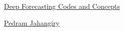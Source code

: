 \documentclass[11pt]{article}
\begin{document}
	\kaishu 
	\setcounter{section}{0}
	\begin{center}
		{\LARGE  \href{https://www.youtube.com/playlist?list=PL2GWo47BFyUPW_lptTNwpKNrpEQvUZerR}{Deep Forecasting Codes and Concepts}}
		
		
		{\large \href{https://github.com/PJalgotrader/}{Pedram Jahangiry}}
	\end{center}
\setcounter{page}{1}



\vspace{-1cm}
\end{document}
